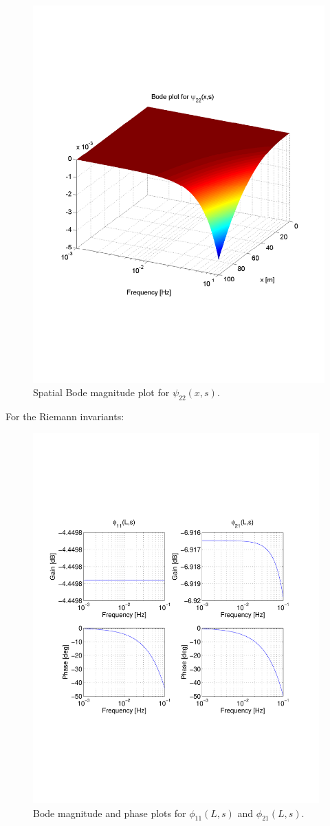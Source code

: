 \documentclass[preprint]{elsarticle}
\begin{document}
\begin{figure}[H]
\centering
\includegraphics[trim = 0mm 60mm 0mm 60mm, width = 120mm]{distr22_-3to-1}
\caption{Spatial Bode magnitude plot for $\psi_{22}(x,s)$.}
\end{figure}
\clearpage

For the Riemann invariants: 
\begin{figure}[H]
\centering
\includegraphics[trim = 0mm 60mm 0mm 60mm, width = 110mm]{diagIOfreeflow}
\caption{Bode magnitude and phase plots for $\phi_{11}(L,s)$ and $\phi_{21}(L,s)$.}
\end{figure}
\end{document}
